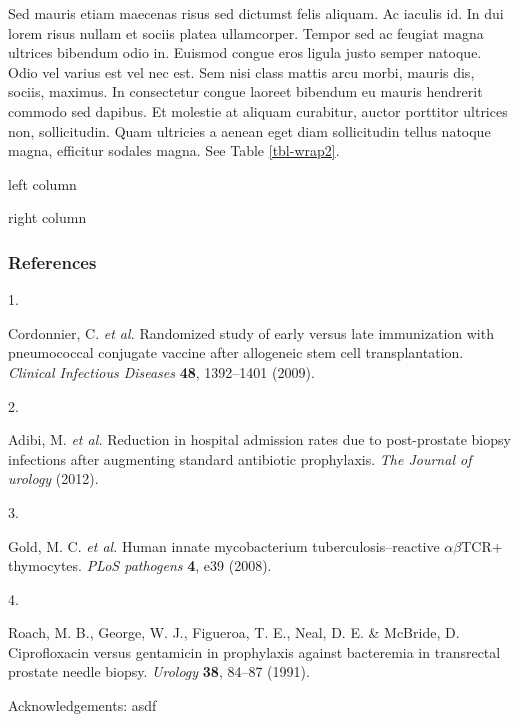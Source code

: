 \documentclass[
  9pt,
  letterpaper,
  DIV=11,
  numbers=noendperiod]{scrartcl}
\newlength{\cslhangindent}
\newlength{\csllabelwidth}
\newlength{\cslentryspacingunit} %
\newenvironment{CSLReferences}[2] %
 {%
  \setlength{\parindent}{0pt}
  \ifodd #1
  \let\oldpar\par
  \def\par{\hangindent=\cslhangindent\oldpar}
  \fi
  \setlength{\parskip}{#2\cslentryspacingunit}
 }%
 {}
\newcommand{\CSLLeftMargin}[1]{\parbox[t]{\csllabelwidth}{#1}}
\newcommand{\CSLRightInline}[1]{\parbox[t]{\linewidth - \csllabelwidth}{#1}\break}
\begin{document}
Sed mauris etiam maecenas risus sed dictumst felis aliquam. Ac iaculis
id. In dui lorem risus nullam et sociis platea ullamcorper. Tempor sed
ac feugiat magna ultrices bibendum odio in. Euismod congue eros ligula
justo semper natoque. Odio vel varius est vel nec est. Sem nisi class
mattis arcu morbi, mauris dis, sociis, maximus. In consectetur congue
laoreet bibendum eu mauris hendrerit commodo sed dapibus. Et molestie at
aliquam curabitur, auctor porttitor ultrices non, sollicitudin. Quam
ultricies a aenean eget diam sollicitudin tellus natoque magna,
efficitur sodales magna. See Table \ref{tbl-wrap2}.

\newpage{}

left column

right column

\hypertarget{references}{%
\subsubsection{References}\label{references}}

\hypertarget{refs}{}
\begin{CSLReferences}{0}{0}
\leavevmode{}%
\CSLLeftMargin{1. }%
\CSLRightInline{Cordonnier, C. \emph{et al.} Randomized study of early
versus late immunization with pneumococcal conjugate vaccine after
allogeneic stem cell transplantation. \emph{Clinical Infectious
Diseases} \textbf{48}, 1392--1401 (2009).}

\leavevmode{}%
\CSLLeftMargin{2. }%
\CSLRightInline{Adibi, M. \emph{et al.} Reduction in hospital admission
rates due to post-prostate biopsy infections after augmenting standard
antibiotic prophylaxis. \emph{The Journal of urology} (2012).}

\leavevmode{}%
\CSLLeftMargin{3. }%
\CSLRightInline{Gold, M. C. \emph{et al.} Human innate mycobacterium
tuberculosis--reactive \(\alpha\)\(\beta\)TCR+ thymocytes. \emph{PLoS
pathogens} \textbf{4}, e39 (2008).}

\leavevmode{}%
\CSLLeftMargin{4. }%
\CSLRightInline{Roach, M. B., George, W. J., Figueroa, T. E., Neal, D.
E. \& McBride, D. Ciprofloxacin versus gentamicin in prophylaxis against
bacteremia in transrectal prostate needle biopsy. \emph{Urology}
\textbf{38}, 84--87 (1991).}

\end{CSLReferences}

Acknowledgements: asdf
\end{document}
